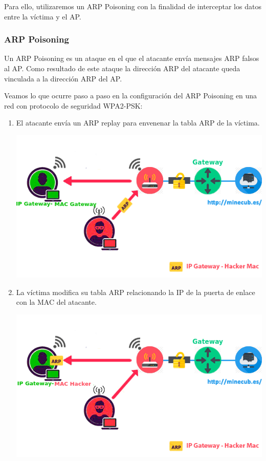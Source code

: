 Para ello, utilizaremos un ARP Poisoning con la finalidad de interceptar los datos entre la víctima y el AP.

\subsubsection{ARP Poisoning}
Un ARP Poisoning es un ataque en el que el atacante envía mensajes ARP falsos al AP. Como resultado de este ataque la dirección ARP del atacante queda vinculada a la dirección ARP del AP.

Veamos lo que ocurre paso a paso en la configuración del ARP Poisoning en una red con protocolo de seguridad WPA2-PSK:
\newpage
\begin{enumerate}
	\item El atacante envía un ARP replay para envenenar la tabla ARP de la víctima.
	\begin{center}
		\includegraphics[scale=0.7]{ARPpoison1.png}
	\end{center}
	\item La víctima modifica su tabla ARP relacionando la IP de la puerta de enlace con la MAC del atacante.
	\begin{center}
		\includegraphics[scale=0.7]{ARPpoison2.png}
	\end{center}
\end{enumerate}

